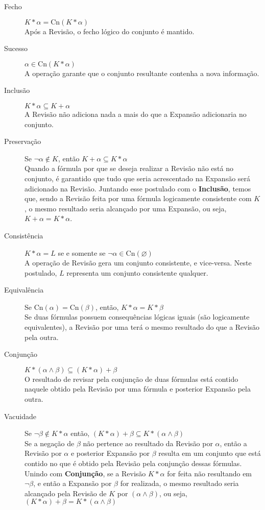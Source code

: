 \begin{description}
	\item[Fecho] $ K \ast \alpha = \text{Cn}(K \ast \alpha) $ \\ Após a Revisão, o fecho lógico do conjunto é mantido.
	\item[Sucesso] $ \alpha \in \text{Cn}(K \ast \alpha) $ \\ A operação garante que o conjunto resultante contenha a nova informação.
	\item[Inclusão] $ K \ast \alpha \subseteq K + \alpha $ \\ A Revisão não adiciona nada a mais do que a Expansão adicionaria no conjunto.
	\item[Preservação] Se $ \lnot \alpha \notin K $, então $ K + \alpha \subseteq K \ast \alpha $ \\ Quando a fórmula por que se deseja realizar a Revisão não está no conjunto, é garantido que tudo que seria acrescentado na Expansão será adicionado na Revisão. Juntando esse postulado com o \textbf{Inclusão}, temos que, sendo a Revisão feita por uma fórmula logicamente consistente com $ K $, o mesmo resultado seria alcançado por uma Expansão, ou seja, $ K + \alpha = K \ast \alpha $. 
	\item[Consistência] $ K \ast \alpha = L $ se e somente se $ \lnot \alpha \in \text{Cn}(\varnothing)$ \\ A operação de Revisão gera um conjunto consistente, e vice-versa. Neste postulado, $ L $ representa um conjunto consistente qualquer.
	\item[Equivalência] Se $ \text{Cn}(\alpha) = \text{Cn}(\beta) $, então, $ K \ast \alpha = K \ast \beta $ \\ Se duas fórmulas possuem consequências lógicas iguais (são logicamente equivalentes), a Revisão por uma terá o mesmo resultado do que a Revisão pela outra.
	\item[Conjunção] $ K \ast (\alpha \land \beta) \subseteq (K \ast \alpha) + \beta $ \\ O resultado de revisar pela conjunção de duas fórmulas está contido naquele obtido pela Revisão por uma fórmula e posterior Expansão pela outra.
	\item[Vacuidade] Se $ \lnot \beta \notin K \ast \alpha $ então, $ (K \ast \alpha) + \beta \subseteq K \ast (\alpha \land \beta) $ \\ Se a negação de $ \beta $ não pertence ao resultado da Revisão por $ \alpha $, então a Revisão por $ \alpha $ e posterior Expansão por $ \beta $ resulta em um conjunto que está contido no que é obtido pela Revisão pela conjunção dessas fórmulas. Unindo com \textbf{Conjunção}, se a Revisão $ K \ast \alpha $ for feita não resultando em $ \lnot \beta $, e então a Expansão por $ \beta $ for realizada, o mesmo resultado seria alcançado pela Revisão de $ K $ por $ (\alpha \land \beta) $, ou seja, $ (K \ast \alpha) + \beta = K \ast (\alpha \land \beta) $    
\end{description}

